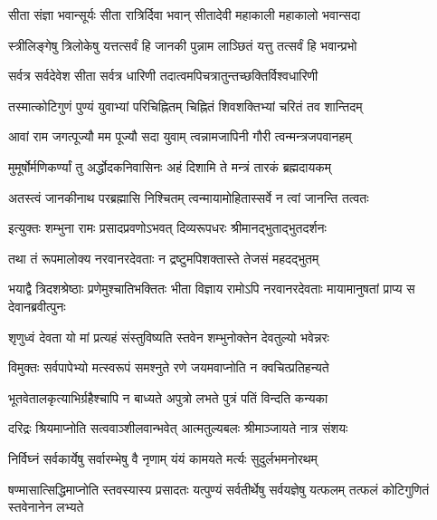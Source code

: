 \twolineshloka
{सीता संज्ञा भवान्सूर्यः सीता रात्रिर्दिवा भवान्}
{सीतादेवी महाकाली महाकालो भवान्सदा}%

\twolineshloka
{स्त्रीलिङ्गेषु त्रिलोकेषु यत्तत्सर्वं हि जानकी}
{पुन्नाम लाञ्छितं यत्तु तत्सर्वं हि भवान्प्रभो}%

\twolineshloka
{सर्वत्र सर्वदेवेश सीता सर्वत्र धारिणी}
{तदात्वमपिचत्रातुन्तच्छक्तिर्विश्वधारिणी}%

\twolineshloka
{तस्मात्कोटिगुणं पुण्यं युवाभ्यां परिचिह्नितम्}
{चिह्नितं शिवशक्तिभ्यां चरितं तव शान्तिदम्}%

\twolineshloka
{आवां राम जगत्पूज्यौ मम पूज्यौ सदा युवाम्}
{त्वन्नामजापिनी गौरी त्वन्मन्त्रजपवानहम्}%

\twolineshloka
{मुमूर्षोर्मणिकर्ण्यां तु अर्द्धोदकनिवासिनः}
{अहं दिशामि ते मन्त्रं तारकं ब्रह्मदायकम्}%

\twolineshloka
{अतस्त्वं जानकीनाथ परब्रह्मासि निश्चितम्}
{त्वन्मायामोहितास्सर्वे न त्वां जानन्ति तत्वतः}%


\twolineshloka
{इत्युक्तः शम्भुना रामः प्रसादप्रवणोऽभवत्}
{दिव्यरूपधरः श्रीमानद्भुताद्भुतदर्शनः}%

\twolineshloka
{तथा तं रूपमालोक्य नरवानरदेवताः}
{न द्रष्टुमपिशक्तास्ते तेजसं महदद्भुतम्}%


\threelineshloka
{भयाद्वै त्रिदशश्रेष्ठाः प्रणेमुश्चातिभक्तितः}
{भीता विज्ञाय रामोऽपि नरवानरदेवताः}
{मायामानुषतां प्राप्य स देवानब्रवीत्पुनः}%


\twolineshloka
{शृणुध्वं देवता यो मां प्रत्यहं संस्तुविष्यति}
{स्तवेन शम्भुनोक्तेन देवतुल्यो भवेन्नरः}%

\twolineshloka
{विमुक्तः सर्वपापेभ्यो मत्स्वरूपं समश्नुते}
{रणे जयमवाप्नोति न क्वचित्प्रतिहन्यते}%

\twolineshloka
{भूतवेतालकृत्याभिर्ग्रहैश्चापि न बाध्यते}
{अपुत्रो लभते पुत्रं पतिं विन्दति कन्यका}%

\twolineshloka
{दरिद्रः श्रियमाप्नोति सत्ववाञ्शीलवान्भवेत्}
{आत्मतुल्यबलः श्रीमाञ्जायते नात्र संशयः}%

\twolineshloka
{निर्विघ्नं सर्वकार्येषु सर्वारम्भेषु वै नृणाम्}
{यंयं कामयते मर्त्यः सुदुर्लभमनोरथम्}%


\threelineshloka
{षण्मासात्सिद्धिमाप्नोति स्तवस्यास्य प्रसादतः}
{यत्पुण्यं सर्वतीर्थेषु सर्वयज्ञेषु यत्फलम्}
{तत्फलं कोटिगुणितं स्तवेनानेन लभ्यते}%


